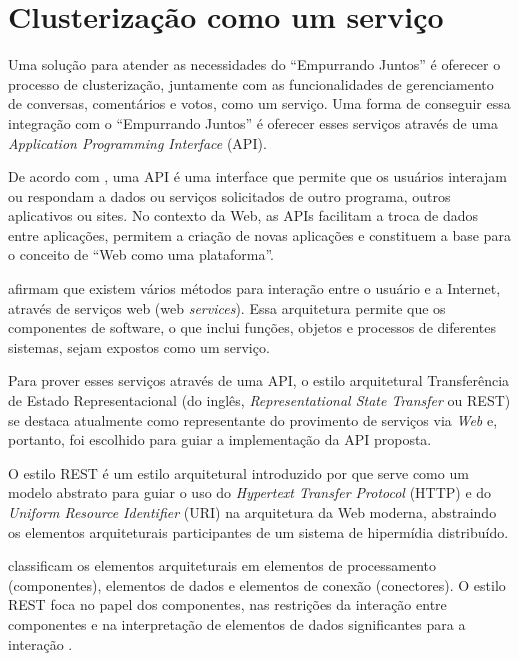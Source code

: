 \chapter{Clusterização como um serviço} \label{cap:api}

  Uma solução para atender as necessidades do ``Empurrando Juntos'' é oferecer
  o processo de clusterização, juntamente com as funcionalidades de gerenciamento
  de conversas, comentários e votos, como um serviço.
  Uma forma de conseguir essa integração com o ``Empurrando Juntos'' é oferecer
  esses serviços através de uma \textit{Application Programming Interface} (API).

  De acordo com , uma API é uma interface que permite que os 
  usuários interajam ou respondam a dados ou serviços solicitados de outro programa, outros
  aplicativos ou sites. No contexto da Web, as APIs facilitam a troca de dados entre 
  aplicações, permitem a criação de novas aplicações e constituem a base para o conceito de 
  ``Web como uma plataforma''.

   afirmam que existem vários métodos para interação entre o  
  usuário e a Internet, através de serviços web (web \textit{services}).
  Essa arquitetura permite que os componentes de software, o que inclui funções,
  objetos e processos de diferentes sistemas, sejam expostos como um serviço.

  Para prover esses serviços através de uma API, o estilo arquitetural Transferência de Estado 
  Representacional (do inglês, \textit{Representational State Transfer} ou REST)
  se destaca atualmente como representante do provimento de serviços via \textit{Web} e, portanto, foi escolhido para
  guiar a implementação da API proposta.

  O estilo REST é um estilo arquitetural introduzido por  que serve como um modelo abstrato
  para guiar o uso do \textit{Hypertext Transfer Protocol} (HTTP) e do \textit{Uniform Resource Identifier} (URI)
  na arquitetura da Web moderna, abstraindo os elementos arquiteturais participantes de um sistema de
  hipermídia distribuído.
  
   classificam os elementos arquiteturais em elementos de processamento (componentes),
  elementos de dados e elementos de conexão (conectores). O estilo REST foca no papel dos componentes, nas restrições
  da interação entre componentes e na interpretação de elementos de dados significantes para a interação \cite{fielding2002}.
  
